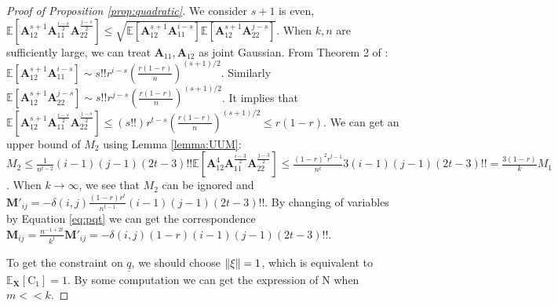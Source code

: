 \documentclass[conference]{IEEEtran}
\DeclarePairedDelimiter\norm{\lVert}{\rVert}
\def\E{\mathbb{E}}
\begin{document}
\begin{proof}[Proof of Proposition \ref{prop:quadratic}]
We consider $s+1$ is even, $\E[\bm{A}_{12}^{s+1} \bm{A}_{11}^{\frac{i - s}{2}}\bm{A}_{22}^{\frac{j - s}{2}}] \leq \sqrt{\E[\bm{A}_{12}^{s+1}\bm{A}_{11}^{i-s}]\E[\bm{A}_{12}^{s+1}\bm{A}_{22}^{j-s}]}$. When $k, n$ are sufficiently large, we can treat $\bm{A}_{11}, \bm{A}_{12}$ as joint Gaussian. From Theorem 2 of \cite{multivariateBeta}: $\E[\bm{A}_{12}^{s+1}\bm{A}_{11}^{i-s}] \sim s!! r^{i-s}(\frac{r(1-r)}{n})^{(s+1)/2}$. Similarly $\E[\bm{A}_{12}^{s+1}\bm{A}_{22}^{j-s}] \sim s!! r^{j-s}(\frac{r(1-r)}{n})^{(s+1)/2}$. It implies that $\E[\bm{A}_{12}^{s+1} \bm{A}_{11}^{\frac{i - s}{2}}\bm{A}_{22}^{\frac{j - s}{2}}] \leq (s!!) r^{t-s}(\frac{r(1-r)}{n})^{(s+1)/2} \leq r(1-r)$. We can get an upper bound of $M_2$ using Lemma \ref{lemma:UUM}: $M_2 \leq \frac{1}{n^{t-2}} (i-1)(j-1)(2t-3)!!\E[\bm{A}_{12}^{4} \bm{A}_{11}^{\frac{i - 3}{2}}\bm{A}_{22}^{\frac{j - 3}{2}}] \leq \frac{(1-r)^2 r^{t-1}}{n^t}3(i-1)(j-1)(2t-3)!!= \frac{3(1-r)}{k} M_1$.
When $k \to \infty$, we see that $M_2$ can be ignored and $\mathbf{M}'_{ij} = -\delta(i,j)\frac{(1-r)r^t}{n^{t-1}}(i-1)(j-1)(2t-3)!!$. By changing of variables by Equation \ref{eq:pqt} we can get the correspondence $\mathbf{M}_{ij} = \frac{n^{-1+2t}}{k^t} \mathbf{M}'_{ij} = -\delta(i,j)(1-r)(i-1)(j-1)(2t-3)!!$. 

To get the constraint on $\underline{q}$, we should choose $\norm{\xi} = 1$, which is equivalent to $\E_{\bm{X}}[\mathrm{C}_1] = 1$. By some computation we can get the expression of $\mathrm{N}$ when $ m << k$.

\end{proof}
\end{document}
